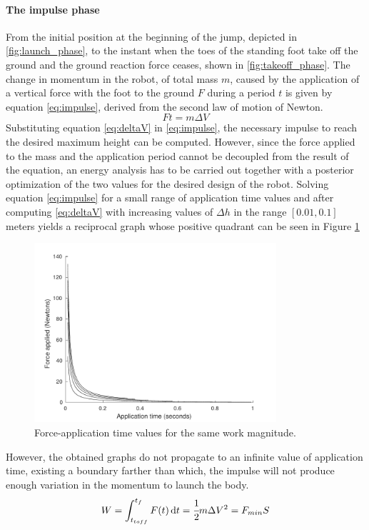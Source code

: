 \paragraph{The impulse phase}
From the initial position at the beginning of the jump, depicted in \ref{fig:launch_phase}, to the instant when the toes of the standing foot take off the ground and the ground reaction force ceases, shown in \ref{fig:takeoff_phase}.
The change in momentum in the robot, of total mass $m$, caused by the application of a vertical force with the foot to the ground $F$ during a period $t$ is given by equation \ref{eq:impulse}, derived from the second law of motion of Newton.
\begin{equation}
\label{eq:impulse}
	F  t = m  \Delta V	
\end{equation} 
Substituting equation \ref{eq:deltaV} in \ref{eq:impulse}, the necessary impulse to reach the desired maximum height can be computed.
However, since the force applied to the mass and the application period cannot be decoupled from the result of the equation, an energy analysis has to be carried out together with a posterior optimization of the two values for the desired design of the robot.
Solving equation \ref{eq:impulse} for a small range of application time values and after computing \ref{eq:deltaV} with increasing values of $\Delta h$ in the range $[0.01,0.1]$ meters yields a reciprocal graph whose positive quadrant can be seen in Figure \ref{fig:f-t}
\begin{figure}[ht!]
	\centering
	\includegraphics[width=0.8\textwidth]{figures/force-timePlot.pdf}
	\caption{Force-application time values for the same work magnitude.}
	\label{fig:f-t}
\end{figure}
However, the obtained graphs do not propagate to an infinite value of application time, existing a boundary farther than which, the impulse will not produce enough variation in the momentum to launch the body.
\begin{equation}
\label{eq:work}
	W = \int_{t_{toff}}^{t_{f}} F(t)\,\mathrm{d}t = \cfrac{1}{2} m \Delta V^2 = F_{min} S
\end{equation}

